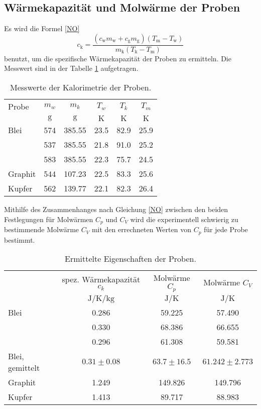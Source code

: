 \subsection{Wärmekapazität und Molwärme der Proben}
Es wird die Formel \ref{NO}
\begin{equation}
	c_\mathup{k}=\frac{(c_\mathup{w}m_\mathup{w}+c_\mathup{g}m_\mathup{g})(T_\mathup{m}-T_\mathup{w})}{m_\mathup{k}(T_\mathup{k}-T_\mathup{m})}
\end{equation}
benutzt, um die spezifische Wärmekapazität der Proben zu ermitteln.
Die Messwert sind in der Tabelle \ref{tab:messung2} aufgetragen.
\begin{table}[htp]
	\centering
	\begin{tabular}{lccccc}
		\toprule
		{Probe}& {$m_w$} & {$m_k$} & {$T_w$} & {$T_k$} & {$T_m$}\\
		&{$\si{\gram}$}& {$\si{\gram}$}  &{$\si{\kelvin}$}& {$\si{\kelvin}$}  &{$\si{\kelvin}$}\\
		\midrule
		Blei		&574&	385.55	& 23.5 &	82.9&	25.9\\
					&537&	385.55	& 21.8 &	91.0&	25.2\\
					&583&	385.55	& 22.3 &	75.7&	24.5\\	
		Graphit		&544&	107.23	& 22.5 &	83.3&	25.6\\
		Kupfer		&562& 	139.77	& 22.1 &	82.3&	26.4\\
		\bottomrule
	\end{tabular}
	\caption{Messwerte der Kalorimetrie der Proben.}
	\label{tab:messung2}
\end{table}
Mithilfe des Zusammenhanges nach Gleichung \eqref{NO} zwischen den beiden Festlegungen für Molwärmen $C_p$ und $C_V$ 
wird die experimentell schwierig zu bestimmende Molwärme $C_V$ mit den errechneten Werten von $C_p$ für jede Probe bestimmt.
\begin{table}[htbp]
	\centering
	\begin{tabular}{lccc}
		\toprule
		&{spez. Wärmekapazität $c_k$}& {Molwärme $C_p$}  &{Molwärme $C_V$}\\
		&{$\si{\joule\per\kelvin\per\kilo\gram}$}  &{$\si{\joule\per\kelvin}$}& {$\si{\joule\per\kelvin}$}\\
		\midrule
		{Blei}	&0.286	&59.225	& 57.490\\
				&0.330	&68.386	& 66.655\\
				&0.296	&61.308	& 59.581\\
		{Blei, gemittelt}	&$0.31\pm0.08$	&$63.7\pm16.5$	&$61.242\pm2.773$\\
		{Graphit}&1.249 &149.826& 149.796\\
		{Kupfer}&1.413	&89.717	& 88.983\\
		\bottomrule
	\end{tabular}
	\caption{Ermittelte Eigenschaften der Proben.}
	\label{wert:proben}
\end{table}

